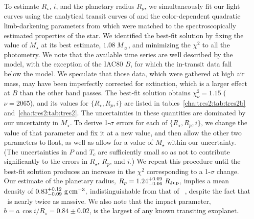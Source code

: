 To estimate $R_{\star}$, $i$, and the planetary radius $R_{p}$, we
simultaneously fit our light curves using the analytical transit
curves of \citet{Mandel_Agol:apjl:2002a} and the color-dependent
quadratic limb-darkening parameters from \citet{Claret:aa:2000a} which
were matched to the spectroscopically estimated properties of the
star.  We identified the best-fit solution by fixing the value of
$M_{\star}$ at its best estimate, $1.08\ M_{\sun}$, and minimizing the
${\chi}^2$ to all the photometry.  We note that the available time
series are well described by the model, with the exception of the
IAC80 $B$, for which the in-transit data fall below the model.  We
speculate that those data, which were gathered at high air mass, may
have been imperfectly corrected for extinction, which is a larger
effect at $B$ than the other band passes.  The best-fit solution
obtains ${\chi}_{\nu}^2=1.15$ ($\nu=2065$), and 
its values for $\{R_{\star}, R_{p},i\}$ are listed in tables~\ref{cha:tres2:tab:tres2b} 
and~\ref{cha:tres2:tab:tres2}. The
uncertainties in these quantities are dominated by our uncertainty in
$M_{\star}$. To derive 1-$\sigma$ errors for each of $\{R_{\star},
R_{p}, i\}$, we change the value of that parameter and fix it at a new
value, and then allow the other two parameters to float, as well as
allow for a value of $M_{\star}$ within our uncertainty. (The uncertainties in 
$P$ and $T_{c}$ are sufficiently small so as not to contribute significantly 
to the errors in $R_{\star}$, $R_{p}$, and $i$.) We repeat
this procedure until the best-fit solution produces an increase in the
${\chi}^2$ corresponding to a 1-$\sigma$ change.  Our estimate of the
planetary radius, $R_{p} = 1.24^{+0.09}_{-0.06}\ R_{\rm Jup}$, implies
a mean density of $0.83^{+0.12}_{-0.09} \ {\rm g\, cm^{-3}}$,
indistinguishable from that of \tresOne\ \citep[using the values
  from][]{Sozzetti_Yong_Torres:apjl:2004a}, despite the fact that
\tresTwo\ is nearly twice as massive. We also note that the impact
parameter, $b = a\, \cos{i} / R_{\star} = 0.84\pm0.02$, is the largest of any
known transiting exoplanet.


